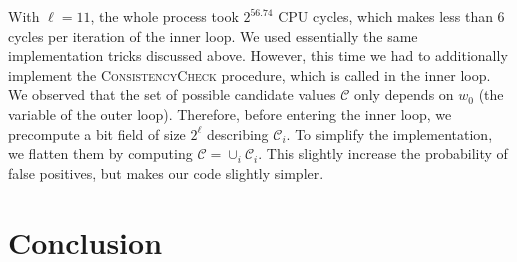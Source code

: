 \documentclass[submission,svgnames,journal=tosc]{iacrtrans}
\begin{document}
With $\ell=11$, the whole process took $2^{56.74}$ CPU cycles, which makes less
than 6 cycles per iteration of the inner loop. We used essentially the same
implementation tricks discussed above. However, this time we had to additionally
implement the \textsc{ConsistencyCheck} procedure, which is called in the inner
loop. We observed that the set of possible candidate values $\mathcal{C}$ only
depends on $w_0$ (the variable of the outer loop). Therefore, before entering
the inner loop, we precompute a bit field of size $2^\ell$ describing
$\mathcal{C}_i$. To simplify the implementation, we flatten them by computing
$\mathcal{C} = \cup_i \mathcal{C}_i$. This slightly increase the probability of
false positives, but makes our code slightly simpler.

\section{Conclusion}




\end{document}
